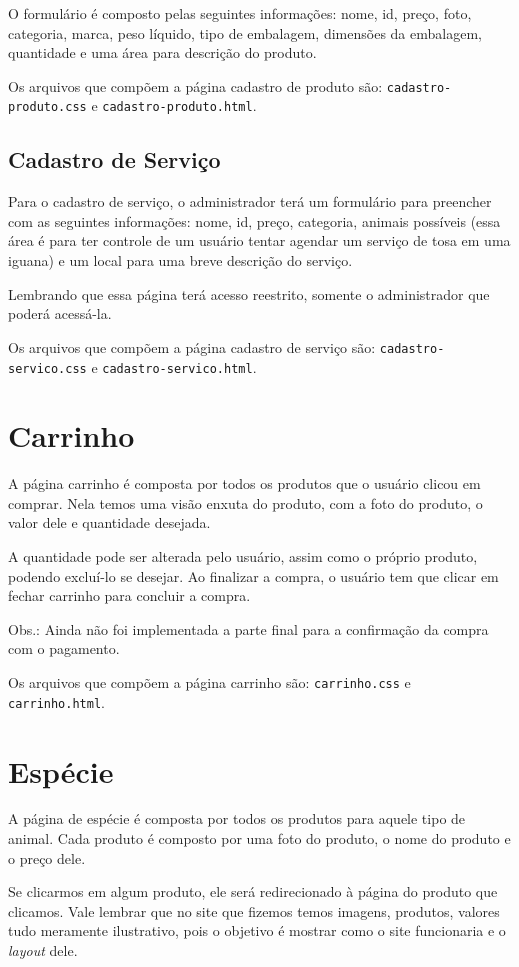 O formulário é composto pelas seguintes informações: nome, id, preço, foto, categoria, marca,
peso líquido, tipo de embalagem, dimensões da embalagem, quantidade e uma área para descrição
do produto.

Os arquivos que compõem a página cadastro de produto são: \texttt{cadastro-produto.css} e
\texttt{cadastro-produto.html}.

\subsection{Cadastro de Serviço}
Para o cadastro de serviço, o administrador terá um formulário para preencher com as seguintes
informações: nome, id, preço, categoria, animais possíveis (essa área é para ter controle de um
usuário tentar agendar um serviço de tosa em uma iguana) e um local para uma breve descrição
do serviço.

Lembrando que essa página terá acesso reestrito, somente o administrador que poderá acessá-la.

Os arquivos que compõem a página cadastro de serviço são: \texttt{cadastro-servico.css} e
\texttt{cadastro-servico.html}.

\section{Carrinho}
A página carrinho é composta por todos os produtos que o usuário clicou em comprar. Nela temos
uma visão enxuta do produto, com a foto do produto, o valor dele e quantidade desejada.

A quantidade pode ser alterada pelo usuário, assim como o próprio produto, podendo excluí-lo se
desejar. Ao finalizar a compra, o usuário tem que clicar em fechar carrinho para concluir a compra.

Obs.: Ainda não foi implementada a parte final para a confirmação da compra com o pagamento.

Os arquivos que compõem a página carrinho são: \texttt{carrinho.css} e \texttt{carrinho.html}.

\section{Espécie}
A página de espécie é composta por todos os produtos para aquele tipo de animal. Cada produto é
composto por uma foto do produto, o nome do produto e o preço dele.

Se clicarmos em algum produto, ele será redirecionado à página do produto que clicamos. Vale lembrar
que no site que fizemos temos imagens, produtos, valores tudo meramente ilustrativo, pois o
objetivo é mostrar como o site funcionaria e o \emph{layout} dele.

